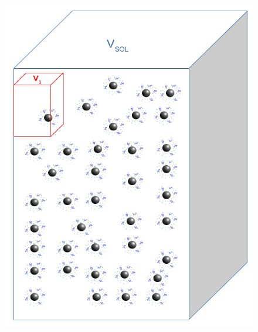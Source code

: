 \documentclass[journal=jacsat,manuscript=article]{achemso}
\begin{document}
\begin{figure}[H] %
\includegraphics[scale=0.5]{fig7.png}
\caption{}
\label{figure 7a}
\end{figure}
\end{document}
